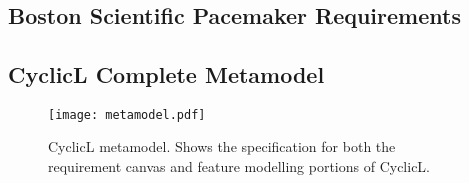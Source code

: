 \chapter{}

\section{Boston Scientific Pacemaker Requirements}
\label{apdx:Req}


\section{CyclicL Complete Metamodel}
\label{apdx:CyclicL_mm}
\begin{figure}
	\centering
	\texttt{[image: metamodel.pdf]}
	\caption{CyclicL metamodel. Shows the specification for both the requirement canvas and feature modelling portions of CyclicL.}
	\label{fig:metamodel}
\end{figure}